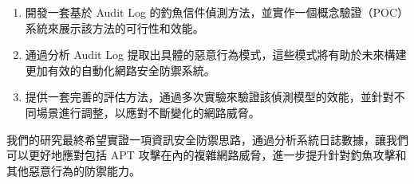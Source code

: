 \documentclass[a4paper,12pt]{article}
\begin{document}
\begin{enumerate}
    \item 開發一套基於 Audit Log 的釣魚信件偵測方法，並實作一個概念驗證（POC）系統來展示該方法的可行性和效能。
    \item 通過分析 Audit Log 提取出具體的惡意行為模式，這些模式將有助於未來構建更加有效的自動化網路安全防禦系統。
    \item 提供一套完善的評估方法，通過多次實驗來驗證該偵測模型的效能，並針對不同場景進行調整，以應對不斷變化的網路威脅。
\end{enumerate}

我們的研究最終希望實證一項資訊安全防禦思路，通過分析系統日誌數據，讓我們可以更好地應對包括 APT 攻擊在內的複雜網路威脅，進一步提升針對釣魚攻擊和其他惡意行為的防禦能力。


\end{document}
